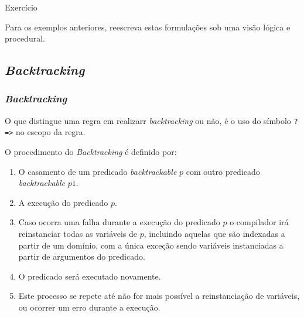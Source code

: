 \begin{frame}[fragile]{Exercício}

Para os exemplos anteriores, reescreva
estas formulações sob uma visão
lógica e  procedural.

\end{frame}



\subsection{\textit{Backtracking}}
\begin{frame}[fragile]

\frametitle{\textit{Backtracking}}

 O que distingue uma regra em realizarr \textit{backtracking} ou não, é o uso do símbolo
        \verb!?=>! no escopo da regra.
        
O procedimento do \textit{Backtracking} é definido por:
    \begin{enumerate}
        
        \item O casamento de um predicado \textit{backtrackable} $p$ com outro predicado \textit{backtrackable} $p1$.
        
        \item A execução do predicado $p$.
        
        \item Caso ocorra uma falha durante a execução do predicado $p$ o compilador irá reinstanciar todas as variáveis de 
        $p$, incluindo aquelas que são indexadas a partir de um domínio, com a única exceção sendo variáveis instanciadas a
        partir de argumentos do predicado.
        
        \item O predicado será executado novamente.
        
        \item Este processo se repete até não for mais possível a reinstanciação de variáveis, ou ocorrer um erro durante a
        execução.
\end{enumerate}

\end{frame}


